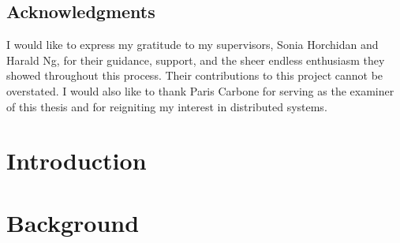 \documentclass[english,bibtex]{kththesis}
\numberwithin{algorithm}{chapter}
\begin{document}
\cleardoublepage


\section*{Acknowledgments}

I would like to express my gratitude to my supervisors, Sonia Horchidan and Harald Ng, for their guidance, support, and the sheer endless enthusiasm they showed throughout this process. Their contributions to this project cannot be overstated. I would also like to thank Paris Carbone for serving as the examiner of this thesis and for reigniting my interest in distributed systems.

\acknowlegmentssignature

\renewcommand{\chaptermark}[1]{\markboth{#1}{}}

\tableofcontents

\cleardoublepage
\listoffigures

\cleardoublepage
\listoftables

\cleardoublepage
\listofalgorithms

\cleardoublepage


\printglossary[
    style=mylong,
    type=\acronymtype,
    title={List of Acronyms and Abbreviations}
]

\ifnomenclature
    \cleardoublepage
    \printnomenclature
\fi

\label{pg:lastPageofPreface}

\mainmatter

\glsresetall

\renewcommand{\chaptermark}[1]{\markboth{#1}{}}


\chapter{Introduction}
\label{ch:introduction}


\cleardoublepage
\chapter{Background}
\label{ch:background}

\end{document}
